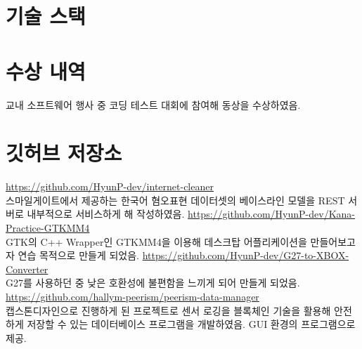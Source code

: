 \documentclass[11pt,a4paper]{moderncv}
\begin{document}
\section{기술 스택}

\section{수상 내역}
{교내 소프트웨어 행사 중 코딩 테스트 대회에 참여해 동상을 수상하였음.}

\section{깃허브 저장소}
{{\footnotesize \url{https://github.com/HyunP-dev/internet-cleaner}}\\
스마일게이트에서 제공하는 한국어 혐오표현 데이터셋의 베이스라인 모델을 REST 서버로 내부적으로 서비스하게 해 작성하였음.}
{{\footnotesize \url{https://github.com/HyunP-dev/Kana-Practice-GTKMM4}}\\
GTK의 C++ Wrapper인 GTKMM4을 이용해 데스크탑 어플리케이션을 만들어보고자 연습 목적으로 만들게 되었음.}
{{\footnotesize \url{https://github.com/HyunP-dev/G27-to-XBOX-Converter}}\\
G27를 사용하던 중 낮은 호환성에 불편함을 느끼게 되어 만들게 되었음.}
{{\footnotesize \url{https://github.com/hallym-peerism/peerism-data-manager}}\\
캡스톤디자인으로 진행하게 된 프로젝트로 센서 로깅을 블록체인 기술을 활용해 안전하게 저장할 수 있는 데이터베이스 프로그램을 개발하였음. GUI 환경의 프로그램으로 제공.}
\ \\
\end{document}
